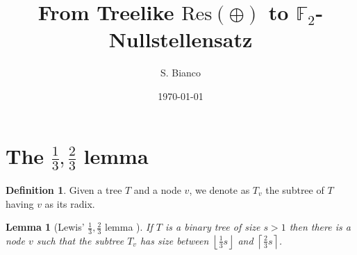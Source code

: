 \documentclass[12pt]{article}
\newtheorem{lemma}{Lemma}
\theoremstyle{definition}
\newtheorem{definition}{Definition}
\newcommand{\F}{\mathbb{F}}
\newcommand{\floor}[1]{\left \lfloor #1 \right \rfloor}
\newcommand{\ceil}[1]{\left \lceil #1 \right \rceil}
\begin{document}
    \title{From Treelike $\mathrm{Res}(\oplus)$ to $\F_2$-Nullstellensatz}
    \author{S. Bianco}
    \date{\today}

    \maketitle

    \hypersetup{linkcolor=black}
    \tableofcontents
    \hypersetup{linkcolor=red}

    \newpage

    \section{The $\frac{1}{3}, \frac{2}{3}$ lemma}

    \begin{definition}
        Given a tree $T$ and a node $v$, we denote as $T_v$ the subtree of $T$ having $v$ as its radix. 
    \end{definition}

    \begin{lemma}[Lewis' $\frac{1}{3}, \frac{2}{3}$ lemma \cite{1-3_2-3}]
        \label{13_23_lewis}
        If $T$ is a binary tree of size $s > 1$ then there is a node $v$ such that the subtree $T_v$ has size between $\floor{\frac{1}{3} s}$ and $\ceil{\frac{2}{3} s}$.
    \end{lemma}
\end{document}

